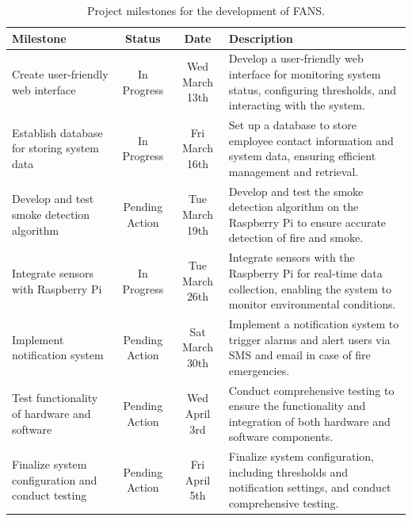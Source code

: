 \begin{table}[H]
    \begin{tabular}{| p{3cm} | c | c | p{7cm} |}
        \hline
        \textbf{Milestone}                           & \textbf{Status} & \textbf{Date}  & \textbf{Description}                                                                                                         \\
        \hline
        Create user-friendly web interface                & In Progress     & Wed March 13th & Develop a user-friendly web interface for monitoring system status, configuring thresholds, and interacting with the system. \\
        \hline
        Establish database for storing system data        & In Progress     & Fri March 16th & Set up a database to store employee
        contact information and system data, ensuring efficient management and retrieval.                                                                                                                                   \\
        \hline
        Develop and test smoke detection algorithm        & Pending Action  & Tue March 19th & Develop and test the smoke
        detection algorithm on the Raspberry Pi to ensure accurate detection of fire and smoke.                                                                                                                             \\
        \hline
        Integrate sensors with Raspberry Pi               & In Progress     & Tue March 26th & Integrate sensors with the Raspberry Pi for
        real-time data collection, enabling the system to monitor environmental conditions.                                                                                                                                 \\
        \hline
        Implement notification system                     & Pending Action  & Sat March 30th & Implement a notification system to trigger
        alarms and alert users via SMS and email in case of fire emergencies.                                                                                                                                               \\
        \hline
        Test functionality of hardware and software       & Pending Action  & Wed April 3rd  & Conduct comprehensive testing to
        ensure the functionality and integration of both hardware and software components.                                                                                                                                  \\
        \hline
        Finalize system configuration and conduct testing & Pending Action  & Fri April 5th  & Finalize system
        configuration, including thresholds and notification settings, and conduct comprehensive testing.                                                                                                                   \\
        \hline
    \end{tabular}
    \caption{Project milestones for the development of FANS.}
\end{table}


